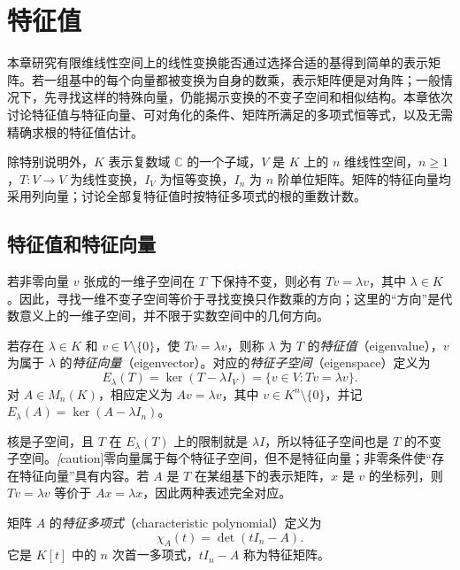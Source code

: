 \setcounter{chapter}{5} %
\chapter{特征值}
\label{chap:xie-eigenvalues}

本章研究有限维线性空间上的线性变换能否通过选择合适的基得到简单的表示矩阵。若一组基中的每个向量都被变换为自身的数乘，表示矩阵便是对角阵；一般情况下，先寻找这样的特殊向量，仍能揭示变换的不变子空间和相似结构。本章依次讨论特征值与特征向量、可对角化的条件、矩阵所满足的多项式恒等式，以及无需精确求根的特征值估计。

除特别说明外，$K$ 表示复数域 $\mathbb C$ 的一个子域，$V$ 是 $K$ 上的 $n$ 维线性空间，$n\geq1$，$T:V\to V$ 为线性变换，$I_V$ 为恒等变换，$I_n$ 为 $n$ 阶单位矩阵。矩阵的特征向量均采用列向量；讨论全部复特征值时按特征多项式的根的重数计数。

\section{特征值和特征向量}
\label{sec:xie-eigenvectors}

若非零向量 $v$ 张成的一维子空间在 $T$ 下保持不变，则必有 $Tv=\lambda v$，其中 $\lambda\in K$。因此，寻找一维不变子空间等价于寻找变换只作数乘的方向；这里的“方向”是代数意义上的一维子空间，并不限于实数空间中的几何方向。

\begin{definition}
\label{def:xie-eigenvalue}
若存在 $\lambda\in K$ 和 $v\in V\setminus\{0\}$，使 $Tv=\lambda v$，则称 $\lambda$ 为 $T$ 的\emph{特征值}（eigenvalue），$v$ 为属于 $\lambda$ 的\emph{特征向量}（eigenvector）。对应的\emph{特征子空间}（eigenspace）定义为
\[
 E_\lambda(T)=\ker(T-\lambda I_V)=\{v\in V:Tv=\lambda v\}.
\]
对 $A\in M_n(K)$，相应定义为 $Av=\lambda v$，其中 $v\in K^n\setminus\{0\}$，并记 $E_\lambda(A)=\ker(A-\lambda I_n)$。
\end{definition}

核是子空间，且 $T$ 在 $E_\lambda(T)$ 上的限制就是 $\lambda I$，所以特征子空间也是 $T$ 的不变子空间。\emph[caution]{零向量属于每个特征子空间，但不是特征向量}；非零条件使“存在特征向量”具有内容。若 $A$ 是 $T$ 在某组基下的表示矩阵，$x$ 是 $v$ 的坐标列，则 $Tv=\lambda v$ 等价于 $Ax=\lambda x$，因此两种表述完全对应。

\begin{definition}
\label{def:xie-characteristic-polynomial}
矩阵 $A$ 的\emph{特征多项式}（characteristic polynomial）定义为
\begin{equation}
\label{eq:xie-characteristic-polynomial}
 \chi_A(t)=\det(tI_n-A).
\end{equation}
它是 $K[t]$ 中的 $n$ 次首一多项式，$tI_n-A$ 称为特征矩阵。
\end{definition}

